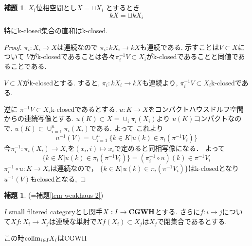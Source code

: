 \documentclass[dvipdfmx,a4paper,11pt]{article}
\newcommand{\colim}{{\rm colim}}
\theoremstyle{definition}
\newtheorem{lem}[thm]{補題}
\newcommand{\xr}[1]{\textcolor{red}{#1}}
\begin{document}
\begin{tcolorbox}
 [colback = white, colframe = green!35!black, fonttitle = \bfseries,breakable = true]
\begin{lem}
\label{lem-k-space}
$X_i$位相空間とし$X = \sqcup X_{i}$
とするとき
$$
kX = \sqcup kX_i
$$

特にk-closed集合の直和はk-closed.
\end{lem}
\end{tcolorbox}
\begin{proof}
$\pi_i : X_i \to X$は連続なので
$\pi_i : kX_i \to kX$も連続である.
示すことは$V \subset X$について
$V$がk-closedであることは各々$\pi_{i}^{-1}V \subset X_i$がk-closedであることと同値であることである. 

$V \subset X$がk-closedとする.
すると, $\pi_{i}: kX_i \to kX$も連続より, $\pi_{i}^{-1}V \subset X_i$k-closedである.

逆に $\pi^{-1}V \subset X_i$k-closedであるとする. 
$u : K\to X$をコンパクトハウスドルフ空間からの連続写像とする. 
$u(K) \subset X = \cup_{i}\pi_{i}(X_i)$より
$u(K)$コンパクトなので, $u(K) \subset \cup_{i=1}^{n}\pi_{i}(X_i)$である.
よって
これより
$$
u^{-1}(V)
=\cup_{i=1}^{n}\{ k \in K | u(k) \in \pi_{i}( \pi^{-1}V_i) \}
$$
今$\pi_{i}^{-1}: \pi_{i}(X_i) \to X_i$を$(x_i, i) \mapsto x_i$で定めると同相写像になる．
よって
$$
\{ k \in K | u(k) \in \pi_{i}( \pi^{-1}V_i) \}
=
(\pi_{i}^{-1}\circ u)(k) \in \pi^{-1}V_i
$$
$\pi_{i}^{-1}\circ u : K \to X_i$は連続なので， $\{ k \in K | u(k) \in \pi_{i}( \pi^{-1}V_i) \}$はk-closedとなり
$u^{-1}(V)$もclosedとなる, 
\end{proof}


\begin{tcolorbox}
 [colback = white, colframe = green!35!black, fonttitle = \bfseries,breakable = true]

\begin{lem}\cite[Lemma 3.3]{Str}{(=補題\ref{lem-weakhaus-2})}

$I$ small filtered categoryとし関手$X : I \to {\bf CGWH}$とする. 
さらに$f: i \to j$について$Xf : X_i \to X_j$は連続な単射で$Xf(X_i) \subset X_j$は$X_j$で閉集合であるとする. 

この時$\colim_{i \in I}X_i$はCGWH
\end{lem}
\end{tcolorbox}
\end{document}
